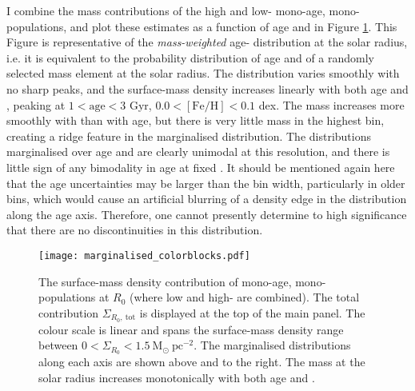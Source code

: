 I combine the mass contributions of the high and low-\afe{} mono-age, mono-\feh{} populations, and plot these estimates as a function of age and \feh{} in Figure \ref{fig:margmass}. This Figure is representative of the \emph{mass-weighted} age-\feh{} distribution at the solar radius, i.e. it is equivalent to the probability distribution of age and \feh{} of a randomly selected mass element at the solar radius. The distribution varies smoothly with no sharp peaks, and the surface-mass density increases linearly with both age and \feh{}, peaking at $1 < \mathrm{age} < 3$ Gyr, $0.0 < \mathrm{[Fe/H]} < 0.1$ dex. The mass increases more smoothly with \feh{} than with age, but there is very little mass in the highest \feh{} bin, creating a ridge feature in the marginalised distribution. The distributions marginalised over age and \feh{} are clearly unimodal at this resolution, and there is little sign of any bimodality in age at fixed \feh{}. It should be mentioned again here that the age uncertainties may be larger than the bin width, particularly in older bins, which would cause an artificial blurring of a density edge in the distribution along the age axis. Therefore, one cannot presently determine to high significance that there are no discontinuities in this distribution.

\begin{figure}
 	\texttt{[image: marginalised\_colorblocks.pdf]}
 	\centering
     \caption[The surface-mass density contribution of mono-age mono-\feh{} populations at the solar radius from APOGEE DR12]{The surface-mass density contribution of mono-age, mono-\feh{} populations at $R_0$ (where low and high-\afe{} are combined). The total contribution $\Sigma_{R_0,\ \mathrm{tot}}$ is displayed at the top of the main panel. The colour scale is linear and spans the surface-mass density range between $0 < \Sigma_{R_0} < 1.5\ \mathrm{M_{\odot}\ pc^{-2}}$. The marginalised distributions along each axis are shown above and to the right. The mass at the solar radius increases monotonically with both age and \feh{}. }
     \label{fig:margmass}
\end{figure}


